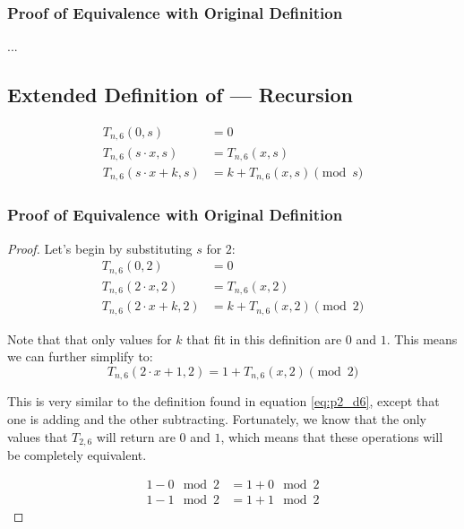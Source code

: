 \documentclass[conference]{IEEEtran}
\begin{document}
\subsubsection{Proof of Equivalence with Original Definition } ...

\subsection{Extended Definition  of \TotalExtensions\xspace --- Recursion}

\begin{equation}
\begin{aligned}
            T_{n,6}(0, s) &= 0 \\
    T_{n,6}(s \cdot x, s) &= T_{n,6}(x, s) \\
T_{n,6}(s \cdot x + k, s) &= k + T_{n,6}(x, s) \pmod{s}
\end{aligned}
\end{equation}

\subsubsection{Proof of Equivalence with Original Definition }

\begin{proof}
    Let's begin by substituting $s$ for $2$:
\begin{equation}
\begin{aligned}
            T_{n,6}(0, 2) &= 0 \\
    T_{n,6}(2 \cdot x, 2) &= T_{n,6}(x, 2) \\
T_{n,6}(2 \cdot x + k, 2) &= k + T_{n,6}(x, 2) \pmod{2}
\end{aligned}
\end{equation}

Note that that only values for $k$ that fit in this definition are $0$ and $1$. This means we can further simplify to:
\begin{equation}
T_{n,6}(2 \cdot x + 1, 2) = 1 + T_{n,6}(x, 2) \pmod{2}
\end{equation}

This is very similar to the definition found in equation \ref{eq:p2_d6}, except that one is adding and the other subtracting. Fortunately, we know that the only values that $T_{2,6}$ will return are $0$ and $1$, which means that these operations will be completely equivalent.

\begin{align*}
1 - 0 \mod{2} &= 1 + 0 \mod{2} \\
1 - 1 \mod{2} &= 1 + 1 \mod{2}
\end{align*}
\end{proof}
\end{document}
